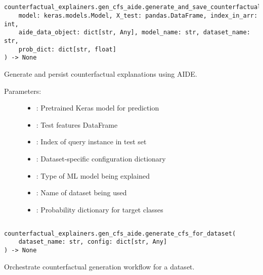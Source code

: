 \subsection{}
\label{func:generate_and_save_counterfactuals}

\begin{lstlisting}
counterfactual_explainers.gen_cfs_aide.generate_and_save_counterfactuals(
    model: keras.models.Model, X_test: pandas.DataFrame, index_in_arr: int,
    aide_data_object: dict[str, Any], model_name: str, dataset_name: str,
    prob_dict: dict[str, float]
) -> None
\end{lstlisting}

Generate and persist counterfactual explanations using AIDE.

\begin{description}
    \item[Parameters:]
        \begin{itemize}
            \item {}: Pretrained Keras model for prediction
            \item {}: Test features DataFrame
            \item {}: Index of query instance in test set
            \item {}: Dataset-specific configuration dictionary
            \item {}: Type of ML model being explained
            \item {}: Name of dataset being used
            \item {}: Probability dictionary for target classes
        \end{itemize}
\end{description}

\subsection{}
\label{func:generate_cfs_for_dataset}

\begin{lstlisting}
counterfactual_explainers.gen_cfs_aide.generate_cfs_for_dataset(
    dataset_name: str, config: dict[str, Any]
) -> None
\end{lstlisting}

Orchestrate counterfactual generation workflow for a dataset.

